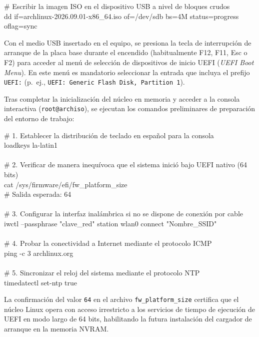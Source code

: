 \documentclass[12pt]{article}
\begin{document}
\begin{mdframed}[style=terminal]
\ttfamily\upshape\color{bashLetterColor}\footnotesize
\# Escribir la imagen ISO en el dispositivo USB a nivel de bloques crudos \\
dd if=archlinux-2026.09.01-x86\_64.iso of=/dev/sdb bs=4M status=progress oflag=sync
\end{mdframed}

Con el medio USB insertado en el equipo, se presiona la tecla de interrupción de arranque de la placa base durante el encendido (habitualmente F12, F11, Esc o F2) para acceder al menú de selección de dispositivos de inicio UEFI (\textit{UEFI Boot Menu}). En este menú es mandatorio seleccionar la entrada que incluya el prefijo \texttt{UEFI:} (p.~ej., \texttt{UEFI: Generic Flash Disk, Partition 1}).

Tras completar la inicialización del núcleo en memoria y acceder a la consola interactiva (\texttt{root@archiso}), se ejecutan los comandos preliminares de preparación del entorno de trabajo:

\begin{mdframed}[style=terminal]
\ttfamily\upshape\color{bashLetterColor}\footnotesize
\# 1. Establecer la distribución de teclado en español para la consola \\
loadkeys la-latin1 \\
\\
\# 2. Verificar de manera inequívoca que el sistema inició bajo UEFI nativo (64 bits) \\
cat /sys/firmware/efi/fw\_platform\_size \\
\# Salida esperada: 64 \\
\\
\# 3. Configurar la interfaz inalámbrica si no se dispone de conexión por cable \\
iwctl --passphrase "clave\_red" station wlan0 connect "Nombre\_SSID" \\
\\
\# 4. Probar la conectividad a Internet mediante el protocolo ICMP \\
ping -c 3 archlinux.org \\
\\
\# 5. Sincronizar el reloj del sistema mediante el protocolo NTP \\
timedatectl set-ntp true
\end{mdframed}

La confirmación del valor \texttt{64} en el archivo \texttt{fw\_platform\_size} certifica que el núcleo Linux opera con acceso irrestricto a los servicios de tiempo de ejecución de UEFI en modo largo de 64 bits, habilitando la futura instalación del cargador de arranque en la memoria NVRAM.
\end{document}
